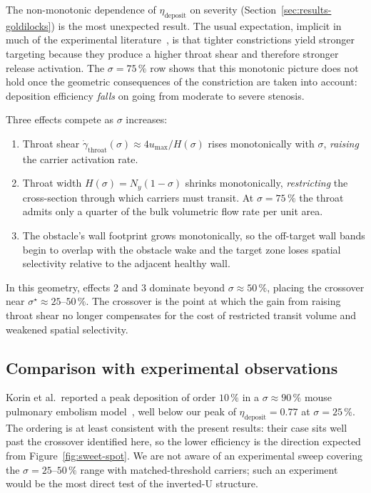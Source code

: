 \documentclass[11pt,a4paper]{article}
\begin{document}
The non-monotonic dependence of $\eta_{\text{deposit}}$ on
severity (Section~\ref{sec:results-goldilocks}) is the most
unexpected result. The usual expectation, implicit in much of the
experimental literature~\citep{korin2012shear}, is that tighter
constrictions yield stronger targeting because they produce a
higher throat shear and therefore stronger release activation.
The $\sigma = 75\,\%$ row shows that this monotonic picture
does not hold once the geometric consequences of the
constriction are taken into account: deposition efficiency
\emph{falls} on going from moderate to severe stenosis.

Three effects compete as $\sigma$ increases:

\begin{enumerate}
\item Throat shear $\dot\gamma_{\text{throat}}(\sigma) \approx
4 u_{\max}/H(\sigma)$ rises monotonically with $\sigma$,
\emph{raising} the carrier activation rate.
\item Throat width $H(\sigma) = N_y(1 - \sigma)$ shrinks
monotonically, \emph{restricting} the cross-section through
which carriers must transit. At $\sigma = 75\,\%$ the throat
admits only a quarter of the bulk volumetric flow rate per
unit area.
\item The obstacle's wall footprint grows monotonically, so the
off-target wall bands begin to overlap with the obstacle wake
and the target zone loses spatial selectivity relative to the
adjacent healthy wall.
\end{enumerate}

In this geometry, effects 2 and 3 dominate beyond
$\sigma \approx 50\,\%$, placing the crossover near
$\sigma^{\star} \approx 25\text{--}50\,\%$. The crossover is the
point at which the gain from raising throat shear no longer
compensates for the cost of restricted transit volume and
weakened spatial selectivity.

\subsection{Comparison with experimental observations}
\label{sec:disc-comparison}

Korin et al.\ reported a peak deposition of order $10\,\%$ in a
$\sigma \approx 90\,\%$ mouse pulmonary embolism
model~\citep{korin2012shear}, well below our peak of
$\eta_{\text{deposit}} = 0.77$ at $\sigma = 25\,\%$. The ordering
is at least consistent with the present results: their case sits
well past the crossover identified here, so the lower efficiency
is the direction expected from Figure~\ref{fig:sweet-spot}. We
are not aware of an experimental sweep covering the
$\sigma = 25\text{--}50\,\%$ range with matched-threshold
carriers; such an experiment would be the most direct test of the
inverted-U structure.
\end{document}
